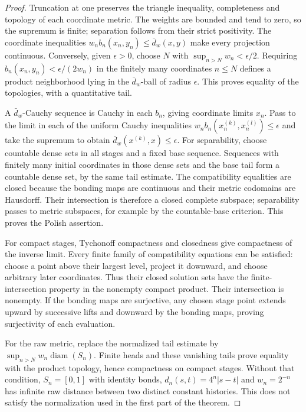 \documentclass[11pt,a4paper]{article}
\theoremstyle{plain}
\theoremstyle{definition}
\theoremstyle{remark}
\begin{document}
\begin{proof}
Truncation at one preserves the triangle inequality, completeness and topology
of each coordinate metric. The weights are bounded and tend to zero, so the
supremum is finite; separation follows from their strict positivity. The
coordinate inequalities $w_nb_n(x_n,y_n)\leq\bar d_w(x,y)$ make every
projection continuous. Conversely, given $\epsilon>0$, choose $N$ with
$\sup_{n>N}w_n<\epsilon/2$. Requiring
$b_n(x_n,y_n)<\epsilon/(2w_n)$ in the finitely many coordinates $n\leq N$
defines a product neighborhood lying in the $\bar d_w$-ball of radius
$\epsilon$. This proves equality of the topologies, with a quantitative tail.

A $\bar d_w$-Cauchy sequence is Cauchy in each $b_n$, giving coordinate
limits $x_n$. Pass to the limit in each of the uniform Cauchy inequalities
$w_nb_n(x_n^{(k)},x_n^{(l)})\leq\epsilon$ and take the supremum to obtain
$\bar d_w(x^{(k)},x)\leq\epsilon$. For separability, choose countable dense
sets in all stages and a fixed base sequence. Sequences with finitely many
initial coordinates in those dense sets and the base tail form a countable
dense set, by the same tail estimate. The compatibility equalities are closed
because the bonding maps are continuous and their metric codomains are
Hausdorff. Their intersection is therefore a closed complete subspace;
separability passes to metric subspaces, for example by the countable-base
criterion. This proves the Polish assertion.

For compact stages, Tychonoff compactness and closedness give compactness
of the inverse limit. Every finite family of compatibility equations can be
satisfied: choose a point above their largest level, project it downward,
and choose arbitrary later coordinates. Thus their closed solution sets
have the finite-intersection property in the nonempty compact product.
Their intersection is nonempty. If the bonding maps are surjective, any
chosen stage point extends upward by successive lifts and downward by the
bonding maps, proving surjectivity of each evaluation.

For the raw metric, replace the normalized tail estimate by
$\sup_{n>N}w_n\operatorname{diam}(S_n)$. Finite heads and these vanishing
tails prove equality with the product topology, hence compactness on compact
stages. Without that condition, $S_n=[0,1]$ with identity bonds,
$d_n(s,t)=4^n|s-t|$ and $w_n=2^{-n}$ has infinite raw distance between two
distinct constant histories. This does not satisfy the normalization used
in the first part of the theorem.
\end{proof}
\end{document}
